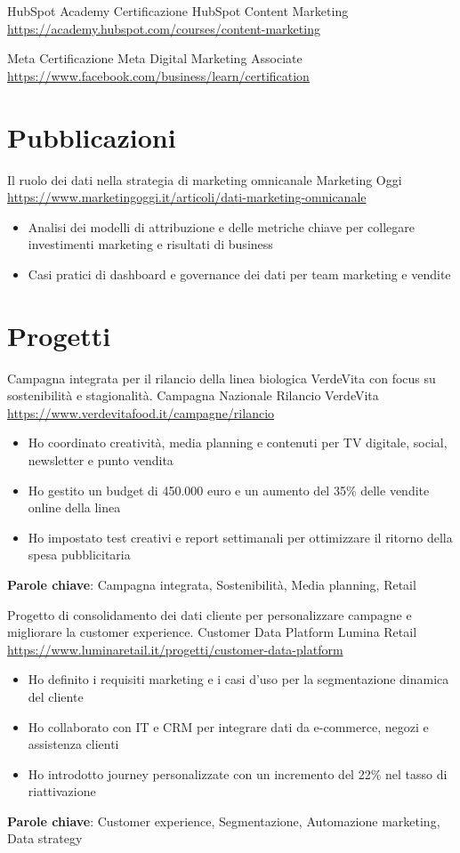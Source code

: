 \documentclass[a4paper, serif, 10pt]{moderncv}
\begin{document}
        {HubSpot Academy}
        {Certificazione HubSpot Content Marketing}
        {\url{https://academy.hubspot.com/courses/content-marketing}}
        {}
        {}

        {Meta}
        {Certificazione Meta Digital Marketing Associate}
        {\url{https://www.facebook.com/business/learn/certification}}
        {}
        {}
\section{Pubblicazioni}

        {Il ruolo dei dati nella strategia di marketing omnicanale}
        {Marketing Oggi}
        {\url{https://www.marketingoggi.it/articoli/dati-marketing-omnicanale}}
        {}
        {\begin{itemize}
\item Analisi dei modelli di attribuzione e delle metriche chiave per collegare investimenti marketing e risultati di business
\item Casi pratici di dashboard e governance dei dati per team marketing e vendite
\end{itemize}}
\section{Progetti}

        {Campagna integrata per il rilancio della linea biologica VerdeVita con focus su sostenibilità e stagionalità.}
        {Campagna Nazionale Rilancio VerdeVita}
        {\url{https://www.verdevitafood.it/campagne/rilancio}}
        {}
        {\begin{itemize}
\item Ho coordinato creatività, media planning e contenuti per TV digitale, social, newsletter e punto vendita
\item Ho gestito un budget di 450.000 euro e un aumento del 35\% delle vendite online della linea
\item Ho impostato test creativi e report settimanali per ottimizzare il ritorno della spesa pubblicitaria
\end{itemize}
\textbf{Parole chiave}: Campagna integrata, Sostenibilità, Media planning, Retail}

        {Progetto di consolidamento dei dati cliente per personalizzare campagne e migliorare la customer experience.}
        {Customer Data Platform Lumina Retail}
        {\url{https://www.luminaretail.it/progetti/customer-data-platform}}
        {}
        {\begin{itemize}
\item Ho definito i requisiti marketing e i casi d'uso per la segmentazione dinamica del cliente
\item Ho collaborato con IT e CRM per integrare dati da e-commerce, negozi e assistenza clienti
\item Ho introdotto journey personalizzate con un incremento del 22\% nel tasso di riattivazione
\end{itemize}
\textbf{Parole chiave}: Customer experience, Segmentazione, Automazione marketing, Data strategy}
\end{document}
